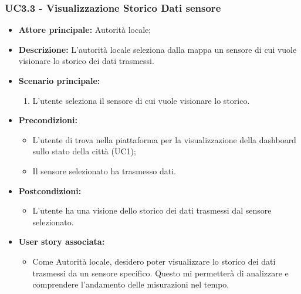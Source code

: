 \subsubsection{UC3.3 - Visualizzazione Storico Dati sensore}
\begin{itemize}
    \item \textbf{Attore principale:} Autorità locale;
    \item \textbf{Descrizione:} L’autorità locale seleziona dalla mappa un sensore di cui vuole visionare lo storico dei dati trasmessi.
    \item \textbf{Scenario principale:}
          \begin{enumerate}
              \item L'utente seleziona il sensore di cui vuole visionare lo storico.
          \end{enumerate}
    \item \textbf{Precondizioni:}
          \begin{itemize}
              \item  L'utente di trova  nella piattaforma per la visualizzazione della dashboard sullo stato della città (UC1);
              \item Il sensore selezionato ha trasmesso dati.
          \end{itemize}
    \item \textbf{Postcondizioni:}
          \begin{itemize}
              \item  L'utente ha una visione dello storico dei dati trasmessi dal sensore selezionato.
          \end{itemize}
    \item \textbf{User story associata:}
          \begin{itemize}
              \item Come Autorità locale, desidero poter visualizzare lo storico dei dati trasmessi da un sensore specifico. Questo mi permetterà di analizzare e comprendere l'andamento delle misurazioni nel tempo.
          \end{itemize}
\end{itemize}